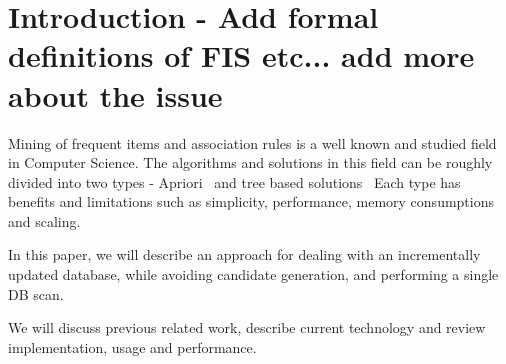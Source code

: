 \section{Introduction - Add formal definitions of FIS etc...  add more about the issue}
Mining of frequent items and association rules is a well known and studied field in Computer Science. The algorithms and solutions in this field can be roughly divided into two types - Apriori~\cite{agrawal1994fast} and tree based solutions~\cite{tsay2009fiut,leung2005cantree,tanbeer2009efficient} Each type has benefits and limitations such as simplicity, performance, memory consumptions and scaling. 


In this paper, we will describe an approach for dealing with an incrementally updated database, while avoiding candidate generation, and performing a single DB scan.

We will discuss previous related work, describe current technology and review implementation, usage and performance.

